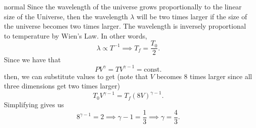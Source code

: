 \begin{solution}{normal}
Since the wavelength of the universe  grows proportionally to the linear size of the Universe, then the wavelength $\lambda$ will be two times larger if the size of the universe becomes two times larger. The wavelength is inversely proportional to temperature by Wien's Law. In other words,
\[\lambda \propto T^{-1}\implies T_f = \frac{T_0}{2}.\]
Since we have that 
\[PV^{\gamma} = TV^{\gamma - 1} = \text{const.}\]
then, we can substitute values to get (note that $V$ becomes $8$ times larger since all three dimensions get two times larger)
\[T_0 V^{\gamma -1} = T_f (8V)^{\gamma - 1}.\]
Simplifying gives us 
\[8^{\gamma - 1} = 2\implies \gamma - 1 = \frac{1}{3}\implies \gamma = \boxed{\frac{4}{3}}.\]
\end{solution}